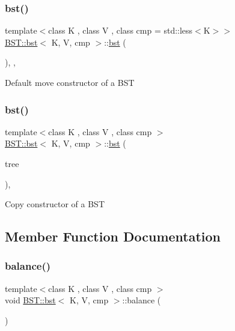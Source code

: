 \subsubsection{\texorpdfstring{bst()}{bst()}\hspace{0.1cm}{\footnotesize\ttfamily [2/3]}}
{\footnotesize\ttfamily template$<$class K , class V , class cmp  = std\+::less$<$\+K$>$$>$ \\
\hyperlink{classBST_1_1bst}{B\+S\+T\+::bst}$<$ K, V, cmp $>$\+::\hyperlink{classBST_1_1bst}{bst} (\begin{DoxyParamCaption}\item[{\hyperlink{classBST_1_1bst}{bst}$<$ K, V, cmp $>$ \&\&}]{ }\end{DoxyParamCaption})\hspace{0.3cm}{\ttfamily [explicit]}, {\ttfamily [default]}, {\ttfamily [noexcept]}}

Default move constructor of a B\+ST \mbox{\label{classBST_1_1bst_a811be23769155f907fbb904af5b87a29}} 
\subsubsection{\texorpdfstring{bst()}{bst()}\hspace{0.1cm}{\footnotesize\ttfamily [3/3]}}
{\footnotesize\ttfamily template$<$class K , class V , class cmp $>$ \\
\hyperlink{classBST_1_1bst}{B\+S\+T\+::bst}$<$ K, V, cmp $>$\+::\hyperlink{classBST_1_1bst}{bst} (\begin{DoxyParamCaption}\item[{const \hyperlink{classBST_1_1bst}{bst}$<$ K, V, cmp $>$ \&}]{tree }\end{DoxyParamCaption})\hspace{0.3cm}{\ttfamily [explicit]}, {\ttfamily [noexcept]}}

Copy constructor of a B\+ST 

\subsection{Member Function Documentation}
\mbox{\label{classBST_1_1bst_af4df6a5c2ae79c5133688b3e117d622b}} 
\subsubsection{\texorpdfstring{balance()}{balance()}}
{\footnotesize\ttfamily template$<$class K , class V , class cmp $>$ \\
void \hyperlink{classBST_1_1bst}{B\+S\+T\+::bst}$<$ K, V, cmp $>$\+::balance (\begin{DoxyParamCaption}{ }\end{DoxyParamCaption})}

